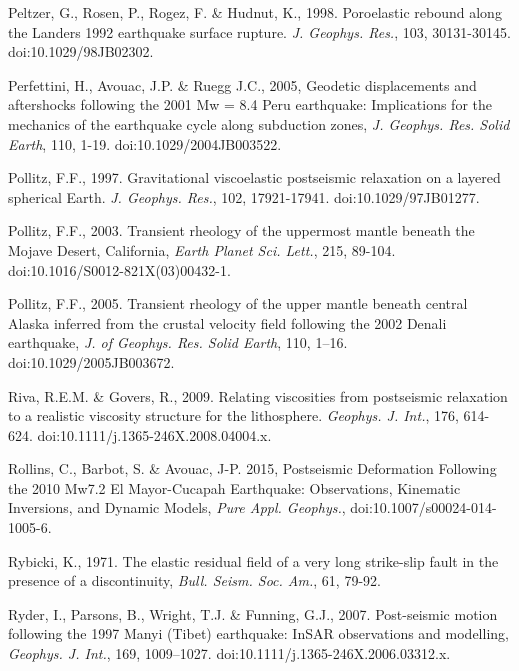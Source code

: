 \documentclass[extra,mreferee]{gji}
\begin{document}
\begin{thebibliography}{}
 Peltzer, G., Rosen, P.,
  Rogez, F. \& Hudnut, K., 1998. Poroelastic rebound along the Landers
  1992 earthquake surface rupture. \textit{J. Geophys. Res.}, 103,
  30131-30145. doi:10.1029/98JB02302.

 Perfettini, H., Avouac,
  J.P. \& Ruegg J.C., 2005, Geodetic displacements and aftershocks
  following the 2001 Mw = 8.4 Peru earthquake: Implications for the
  mechanics of the earthquake cycle along subduction zones,
  \textit{J. Geophys.  Res. Solid Earth}, 110,
  1-19. doi:10.1029/2004JB003522.

 Pollitz, F.F.,
  1997. Gravitational viscoelastic postseismic relaxation on a layered
  spherical Earth. \textit{J. Geophys. Res.}, 102,
  17921-17941. doi:10.1029/97JB01277.

 Pollitz, F.F., 2003. Transient
  rheology of the uppermost mantle beneath the Mojave Desert,
  California, \textit{Earth Planet Sci. Lett.}, 215,
  89-104. doi:10.1016/S0012-821X(03)00432-1.

Pollitz, F.F., 2005. Transient
  rheology of the upper mantle beneath central Alaska inferred from
  the crustal velocity field following the 2002 Denali earthquake,
  \textit{J. of Geophys. Res. Solid Earth}, 110,
  1–16. doi:10.1029/2005JB003672.

 Riva, R.E.M. \&
  Govers, R., 2009. Relating viscosities from postseismic relaxation
  to a realistic viscosity structure for the
  lithosphere. \textit{Geophys. J.  Int.}, 176,
  614-624. doi:10.1111/j.1365-246X.2008.04004.x.

 Rollins, C., Barbot,
  S. \& Avouac, J-P. 2015, Postseismic Deformation Following the 2010
  Mw7.2 El Mayor-Cucapah Earthquake: Observations, Kinematic
  Inversions, and Dynamic Models, \textit{Pure Appl. Geophys.},
  doi:10.1007/s00024-014-1005-6.

 Rybicki, K., 1971. The elastic
  residual field of a very long strike-slip fault in the presence of a
  discontinuity, \textit{Bull. Seism. Soc. Am.}, 61, 79-92.

 Ryder, I., Parsons, B.,
  Wright, T.J. \& Funning, G.J., 2007.  Post-seismic motion following
  the 1997 Manyi (Tibet) earthquake: InSAR observations and
  modelling, \textit{Geophys. J. Int.}, 169,
  1009–1027. doi:10.1111/j.1365-246X.2006.03312.x.



\end{thebibliography}
\end{document}
